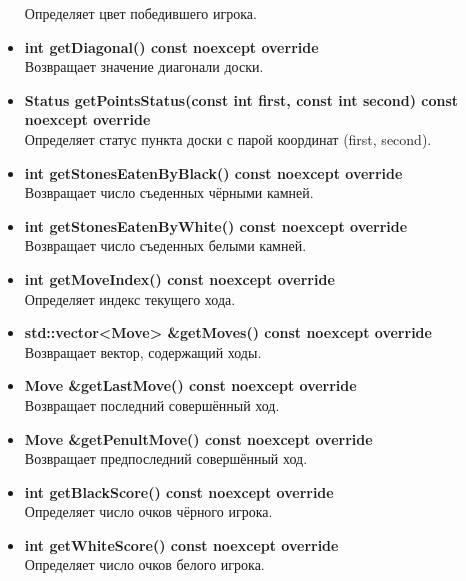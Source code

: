 \begin{itemize}
	Определяет цвет победившего игрока.\\

\item\textbf{int getDiagonal() const noexcept override}\\

	Возвращает значение диагонали доски.\\

\item\textbf{Status getPointsStatus(const int first, const int second) const noexcept override}\\
	
	Определяет статус пункта доски с парой координат (first, second).\\

\item\textbf{int getStonesEatenByBlack() const noexcept override}\\

	Возвращает число съеденных чёрными камней.\\

\item\textbf{int getStonesEatenByWhite() const noexcept override}\\

	Возвращает число съеденных белыми камней.\\

\item\textbf{int getMoveIndex() const noexcept override}\\

	Определяет индекс текущего хода.\\

\item\textbf{std::vector<Move> \&getMoves() const noexcept override}\\

	Возвращает вектор, содержащий ходы.\\

\item\textbf{Move \&getLastMove() const noexcept override}\\

	Возвращает последний совершённый ход.\\

\item\textbf{Move \&getPenultMove() const noexcept override}\\

	Возвращает предпоследний совершённый ход.\\

\item\textbf{int getBlackScore() const noexcept override}\\

	Определяет число очков чёрного игрока.\\

\item\textbf{int getWhiteScore() const noexcept override}\\	

	Определяет число очков белого игрока.\\

\end{itemize}

